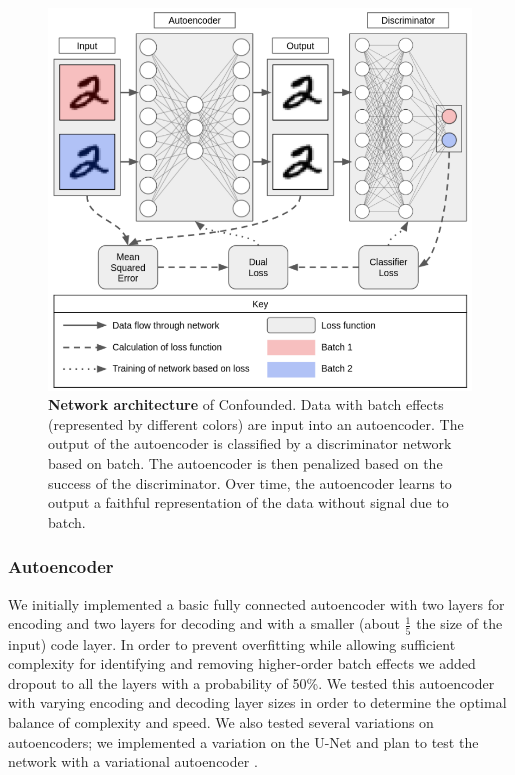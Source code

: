 \documentclass[notitlepage]{article}
\begin{document}
\begin{figure}
	\centering
	\includegraphics[width=4.5in]{figures/rough/network}
	\caption{\textbf{Network architecture} of Confounded.
	Data with batch effects (represented by different colors) are input into an autoencoder.
	The output of the autoencoder is classified by a discriminator network based on batch.
	The autoencoder is then penalized based on the success of the discriminator.
	Over time, the autoencoder learns to output a faithful representation of the data without signal due to batch.}
	\label{fig:network}
\end{figure}

\subsubsection{Autoencoder}

We initially implemented a basic fully connected autoencoder with two layers for encoding and two layers for decoding and with a smaller (about $\frac{1}{5}$ the size of the input) code layer.
In order to prevent overfitting while allowing sufficient complexity for identifying and removing higher-order batch effects we added dropout to all the layers with a probability of 50\%.
We tested this autoencoder with varying encoding and decoding layer sizes in order to determine the optimal balance of complexity and speed.
We also tested several variations on autoencoders; we implemented a variation on the U-Net \cite{ronneberger_u-net_2015} and plan to test the network with a variational autoencoder \cite{kingma_auto-encoding_2013}.
\end{document}
